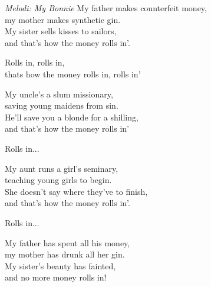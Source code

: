 {\footnotesize\textit{Melodi: My Bonnie}}
My father makes counterfeit money,\\
my mother makes synthetic gin.\\
My sister sells kisses to sailors,\\
and that's how the money rolls in'.\par
\vspace{10pt}
\revrpt Rolls in, rolls in,\\
thats how the money rolls in, rolls in'\rpt\par
\vspace{10pt}
My uncle's a slum missionary,\\
saving young maidens from sin.\\
He'll save you a blonde for a shilling,\\
and that's how the money rolls in'\par
\vspace{10pt}
Rolls in...\par
\vspace{10pt}
My aunt runs a girl's seminary,\\
teaching young girls to begin.\\
She doesn't say where they've to finish,\\
and that's how the money rolls in'.\par
\vspace{10pt}
Rolls in...\par
\vspace{10pt}
My father has spent all his money,\\
my mother has drunk all her gin.\\
My sister’s beauty has fainted,\\
and no more money rolls in!\par
\vspace{10pt}
